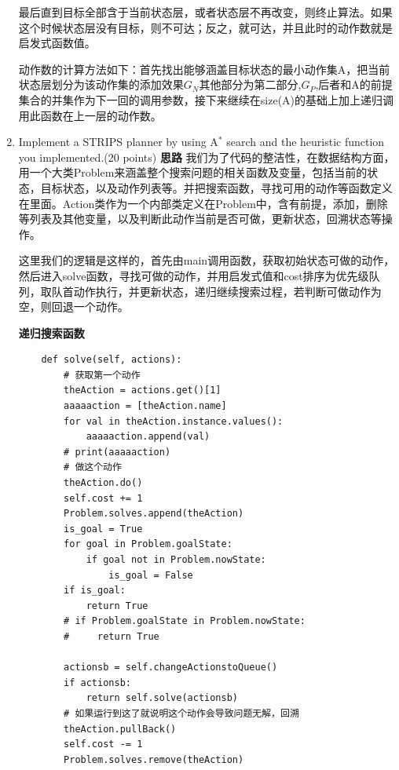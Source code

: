 \documentclass[a4paper, 11pt]{article}
\begin{document}
\begin{enumerate}
    最后直到目标全部含于当前状态层，或者状态层不再改变，则终止算法。如果这个时候状态层没有目标，则不可达；反之，就可达，并且此时的动作数就是启发式函数值。
    
    动作数的计算方法如下：首先找出能够涵盖目标状态的最小动作集A，把当前状态层划分为该动作集的添加效果$G_N$其他部分为第二部分,$G_P$,后者和A的前提集合的并集作为下一回的调用参数，接下来继续在size(A)的基础上加上递归调用此函数在上一层的动作数。
        

\item Implement a STRIPS planner by using A$^*$ search and the heuristic function you implemented.(20 points)
\textbf{思路}
	我们为了代码的整洁性，在数据结构方面，用一个大类Problem来涵盖整个搜索问题的相关函数及变量，包括当前的状态，目标状态，以及动作列表等。并把搜索函数，寻找可用的动作等函数定义在里面。Action类作为一个内部类定义在Problem中，含有前提，添加，删除等列表及其他变量，以及判断此动作当前是否可做，更新状态，回溯状态等操作。
	
	这里我们的逻辑是这样的，首先由main调用函数，获取初始状态可做的动作，然后进入solve函数，寻找可做的动作，并用启发式值和cost排序为优先级队列，取队首动作执行，并更新状态，递归继续搜索过程，若判断可做动作为空，则回退一个动作。
	
	\textbf{递归搜索函数}
	\begin{lstlisting}
    def solve(self, actions):
        # 获取第一个动作
        theAction = actions.get()[1]
        aaaaaction = [theAction.name]
        for val in theAction.instance.values():
            aaaaaction.append(val)
        # print(aaaaaction)
        # 做这个动作
        theAction.do()
        self.cost += 1
        Problem.solves.append(theAction)
        is_goal = True
        for goal in Problem.goalState:
            if goal not in Problem.nowState:
                is_goal = False
        if is_goal:
            return True
        # if Problem.goalState in Problem.nowState:
        #     return True

        actionsb = self.changeActionstoQueue()
        if actionsb:
            return self.solve(actionsb)
        # 如果运行到这了就说明这个动作会导致问题无解，回溯
        theAction.pullBack()
        self.cost -= 1
        Problem.solves.remove(theAction)	
	\end{lstlisting}


\end{enumerate}
\end{document}
